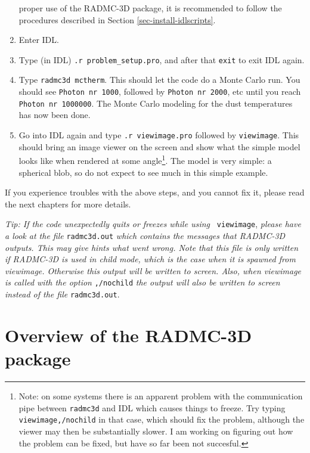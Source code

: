 \documentclass{report}
\begin{document}
\begin{enumerate}
{    proper use of the RADMC-3D package, it is recommended to follow the
    procedures described in Section \ref{sec-install-idlscripts}.}
\item Enter IDL. 
\item Type (in IDL) {\small\tt .r problem\_setup.pro}, and after that 
{\small\tt exit} to exit IDL again.
\item Type {\small\tt radmc3d mctherm}. This should let the code do a Monte
  Carlo run. You should see {\small\tt Photon nr 1000}, followed by
  {\small\tt Photon nr 2000}, etc until you reach {\small\tt Photon nr
    1000000}. The Monte Carlo modeling for the dust temperatures has now
  been done.
\item Go into IDL again and type {\small\tt .r viewimage.pro} followed by
  {\small\tt viewimage}. This should bring an image viewer on the screen and
  show what the simple model looks like when rendered at some
  angle\footnote{Note: on some systems there is an apparent problem with the
    communication pipe between {\small\tt radmc3d} and IDL which causes
    things to freeze. Try typing {\small\tt viewimage,/nochild} in that
    case, which should fix the problem, although the viewer may then be
    substantially slower. I am working on figuring out how the problem can
    be fixed, but have so far been not succesful.}. The model is very
  simple: a spherical blob, so do not expect to see much in this simple
  example.
\end{enumerate}
If you experience troubles with the above steps, and you cannot fix it,
please read the next chapters for more details. 

{\em Tip: If the code unexpectedly quits or freezes while using} {\small\tt
  viewimage}, {\em please have a look at the file} {\small\tt radmc3d.out}
{\em which contains the messages that RADMC-3D outputs. This may give hints
  what went wrong. Note that this file is only written if RADMC-3D is used
  in child mode, which is the case when it is spawned from viewimage.
  Otherwise this output will be written to screen. Also, when viewimage is
  called with the option} {\small\tt ,/nochild} {\em the output will also be
  written to screen instead of the file} {\small\tt radmc3d.out}.




\chapter{Overview of the RADMC-3D package}
\end{document}

